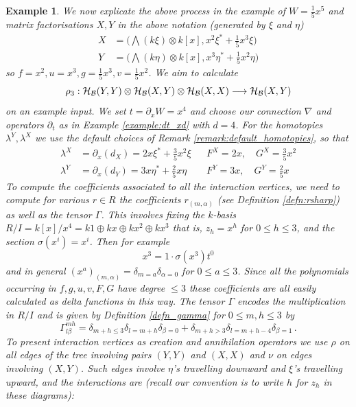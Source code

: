 \documentclass[english,letter paper,12pt,leqno]{article}
\theoremstyle{example}
\newtheorem{example}[theorem]{Example}
\numberwithin{equation}{section}
\def\BB{\mathcal{B}}
\def\HH{\HH}
\def\HH{\mathcal{H}}
\begin{document}
\begin{example} We now explicate the above process in the example of $W = \frac{1}{5} x^5$ and matrix factorisations $X,Y$ in the above notation (generated by $\xi$ and $\eta$)
\begin{align}
X &= \big( \bigwedge(k \xi) \otimes k[x], x^2 \xi^* + \frac{1}{5} x^3 \xi \big)\\
Y &= \big( \bigwedge(k \eta) \otimes k[x], x^3 \eta^* + \frac{1}{5} x^2 \eta \big)
\end{align}
so $f = x^2, u = x^3, g = \frac{1}{5}x^3, v = \frac{1}{5} x^2$. We aim to calculate
\[
\rho_3: \HH_{\BB}(Y,Y) \otimes \HH_{\BB}(X, Y) \otimes \HH_{\BB}(X,X) \lto \HH_{\BB}(X,Y)
\]
on an example input. We set $t = \partial_x W = x^4$ and choose our connection $\nabla$ and operators $\partial_t$ as in Example \ref{example:dt_xd} with $d = 4$. For the homotopies $\lambda^Y, \lambda^X$ we use the default choices of Remark \ref{remark:default_homotopies}, so that
\begin{align*}
\lambda^X &= \partial_x( d_X ) = 2 x \xi^* + \frac{3}{5} x^2 \xi && F^X = 2x, \quad G^X = \frac{3}{5} x^2\\
\lambda^Y &= \partial_x( d_Y ) = 3 x \eta^* + \frac{2}{5} x \eta && F^Y = 3x, \quad G^Y = \frac{2}{5} x
\end{align*}
To compute the coefficients associated to all the interaction vertices, we need to compute for various $r \in R$ the coefficients $r_{(m,\alpha)}$ (see Definition \ref{defn:rsharp}) as well as the tensor $\Gamma$. This involves fixing the $k$-basis $R/I = k[x]/x^4 = k1 \oplus kx \oplus kx^2 \oplus kx^3$ that is, $z_h = x^h$ for $0 \le h \le 3$, and the section $\sigma(x^i) = x^i$. Then for example
\[
x^3 = 1 \cdot \sigma( x^3 ) t^0
\]
and in general $(x^a)_{(m,\alpha)} = \delta_{m = a} \delta_{\alpha = 0}$ for $0 \le a \le 3$. Since all the polynomials occurring in $f,g,u,v,F,G$ have degree $\le 3$ these coefficients are all easily calculated as delta functions in this way. The tensor $\Gamma$ encodes the multiplication in $R/I$ and is given by Definition \ref{defn_gamma} for $0 \le m,h \le 3$ by
\[
\Gamma^{mh}_{l \beta} = \delta_{m+h \le 3}\delta_{l = m+h}\delta_{\beta = 0} + \delta_{m+h > 3} \delta_{l = m+h-4} \delta_{\beta = 1}\,.
\]
To present interaction vertices as creation and annihilation operators we use $\rho$ on all edges of the tree involving pairs $(Y,Y)$ and $(X,X)$ and $\nu$ on edges involving $(X,Y)$. Such edges involve $\eta$'s travelling downward and $\xi$'s travelling upward, and the interactions are (recall our convention is to write $h$ for $z_h$ in these diagrams):

\end{example}
\end{document}
